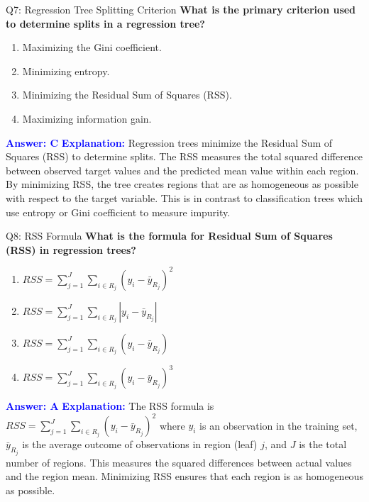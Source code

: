 \documentclass[8pt]{beamer}
\begin{document}
	\begin{frame}{Q7: Regression Tree Splitting Criterion}
		\fontsize{6.5}{7.5}\selectfont
		\textbf{What is the primary criterion used to determine splits in a regression tree?}
		\begin{enumerate}
			\item Maximizing the Gini coefficient.
			\item Minimizing entropy.
			\item Minimizing the Residual Sum of Squares (RSS).
			\item Maximizing information gain.
		\end{enumerate}
		\vspace{0.1cm}
		\textcolor{blue}{\textbf{Answer: C}}
		\vspace{0.1cm}
		\textcolor{blue}{\textbf{Explanation:}} Regression trees minimize the Residual Sum of Squares (RSS) to determine splits. The RSS measures the total squared difference between observed target values and the predicted mean value within each region. By minimizing RSS, the tree creates regions that are as homogeneous as possible with respect to the target variable. This is in contrast to classification trees which use entropy or Gini coefficient to measure impurity.
	\end{frame}
	
	\begin{frame}{Q8: RSS Formula}
		\fontsize{6.5}{7.5}\selectfont
		\textbf{What is the formula for Residual Sum of Squares (RSS) in regression trees?}
		\begin{enumerate}
			\item $RSS = \sum_{j=1}^J \sum_{i \in R_j} (y_i - \bar{y}_{R_j})^2$
			\item $RSS = \sum_{j=1}^J \sum_{i \in R_j} |y_i - \bar{y}_{R_j}|$
			\item $RSS = \sum_{j=1}^J \sum_{i \in R_j} (y_i - \bar{y}_{R_j})$
			\item $RSS = \sum_{j=1}^J \sum_{i \in R_j} (y_i - \bar{y}_{R_j})^3$
		\end{enumerate}
		\vspace{0.1cm}
		\textcolor{blue}{\textbf{Answer: A}}
		\vspace{0.1cm}
		\textcolor{blue}{\textbf{Explanation:}} The RSS formula is $RSS = \sum_{j=1}^J \sum_{i \in R_j} (y_i - \bar{y}_{R_j})^2$ where $y_i$ is an observation in the training set, $\bar{y}_{R_j}$ is the average outcome of observations in region (leaf) $j$, and $J$ is the total number of regions. This measures the squared differences between actual values and the region mean. Minimizing RSS ensures that each region is as homogeneous as possible.
	\end{frame}
	
\end{document}
